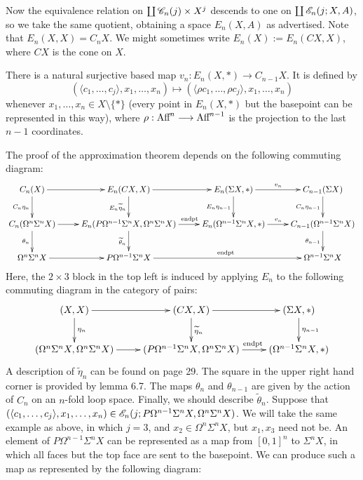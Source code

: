 \documentclass[11pt]{article}
\newcommand{\Aff}{\textup{Aff}}
\begin{document}
\begin{chapter4-6}
\begin{center}
\begin{tikzpicture}[scale=.5]
\end{tikzpicture}
\end{center}
Now the equivalence relation on $\coprod \scrC_n(j)\times X^j$ descends to one on  $\coprod \scrE_n(j;X,A)$, so we take the same quotient, obtaining a space $E_n(X,A)$ as advertised. Note that $E_n(X,X)=C_nX$. We might sometimes write $E_n(X):=E_n(CX,X)$, where $CX$ is the cone on $X$.
\begin{lem*}[6.7]
There is a natural surjective based map $v_n:E_n(X,*)\to C_{n-1}X$. It is defined by 
\[(\langle c_1,\ldots,c_j\rangle,x_1,\ldots,x_n)\mapsto (\langle \rho c_1,\ldots,\rho c_j\rangle,x_1,\ldots,x_n)\]
whenever $x_1,\ldots,x_n\in X\setminus\{*\}$ (every point in $E_n(X,*)$ but the basepoint can be represented in this way), where $\rho:\Aff^n\to\Aff^{n-1}$ is the projection to the last $n-1$ coordinates.
\end{lem*}
The proof of the approximation theorem depends on the following commuting diagram:
\[\xymatrix{
C_n(X)\ar[r]\ar[d]_{C_n\eta_n}&
E_n(CX,X)\ar[d]_{E_n\widetilde{\eta}_n}\ar[r]&
E_n(\Sigma X,*)\ar[r]^{v_n}\ar[d]_{E_n\eta_{n-1}}&
C_{n-1}(\Sigma X)\ar[d]_{C_n\eta_{n-1}}\\
C_n(\Omega^n\Sigma^nX)\ar[r]\ar[d]_{\theta_n}&
E_n(P\Omega^{n-1}\Sigma^nX,\Omega^{n}\Sigma^nX)
\ar[r]^{\qquad \textup{endpt}}\ar[d]_{\widetilde{\theta}_n}&
E_n(\Omega^{n-1}\Sigma^nX,*)\ar[r]^{v_n}&
C_{n-1}(\Omega^{n-1}\Sigma^nX)\ar[d]_{\theta_{n-1}}\\
\Omega^n\Sigma^nX\ar[r]&
P\Omega^{n-1}\Sigma^nX\ar[rr]^{\textup{endpt}}&&
\Omega^{n-1}\Sigma^nX
}\]
Here, the $2\times3$ block in the top left is induced by applying $E_n$ to the following commuting diagram in the category of pairs:
\[\xymatrix{
(X,X)\ar[r]\ar[d]^{\eta_n}&
(CX,X)\ar[r]\ar[d]^{\widetilde{\eta}_n}&
(\Sigma X,*)\ar[d]^{\eta_{n-1}}\\
(\Omega^n\Sigma^nX,\Omega^n\Sigma^nX)\ar[r]&
(P\Omega^{n-1}\Sigma^nX,\Omega^n\Sigma^nX)\ar[r]^{\textup{\qquad endpt}}&
(\Omega^{n-1}\Sigma^nX,*)
}\]
A description of $\widetilde{\eta}_{n}$ can be found on page 29. The square in the upper right hand corner is provided by lemma 6.7. The maps $\theta_n$ and $\theta_{n-1}$ are given by the action of $C_n$ on an $n$-fold loop space. Finally, we should describe $\widetilde{\theta}_n$. Suppose that $(\langle c_1,\ldots,c_j\rangle,x_1,\ldots,x_n)\in\scrE_n(j;P\Omega^{n-1}\Sigma^nX,\Omega^n\Sigma^nX)$. We will take the same example as above, in which $j=3$, and $x_2\in \Omega^n\Sigma^n X$, but $x_1,x_3$ need not be. An element of $P\Omega^{n-1}\Sigma^nX$ can be represented as a map from $[0,1]^{n}$ to $\Sigma^nX$, in which all faces but the top face are sent to the basepoint. We can produce such a map as represented by the following diagram:

\end{chapter4-6}
\end{document}
